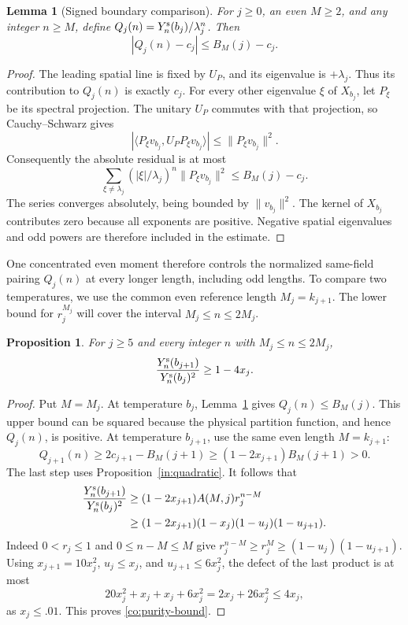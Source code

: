 \documentclass[11pt]{article}
\newtheorem{proposition}[theorem]{Proposition}
\newtheorem{lemma}[theorem]{Lemma}
\theoremstyle{remark}
\numberwithin{equation}{section}
\begin{document}
\begin{lemma}[Signed boundary comparison]\label{co:signed}
For $j\ge0$, an even $M\ge2$, and any integer $n\ge M$, define
$Q_j(n)=Y_n^{\rm s}(b_j)/\lambda_j^n$. Then
\begin{equation}\label{co:error}
 |Q_j(n)-c_j|\le B_M(j)-c_j.
\end{equation}
\end{lemma}
\begin{proof}
The leading spatial line is fixed by $U_P$, and its eigenvalue is
$+\lambda_j$. Thus its contribution to $Q_j(n)$ is exactly $c_j$.
For every other eigenvalue $\xi$ of $X_{b_j}$, let $P_\xi$ be its
spectral projection. The unitary $U_P$ commutes with that projection,
so Cauchy--Schwarz gives
\[
 |\langle P_\xi v_{b_j},U_P P_\xi v_{b_j}\rangle|
 \le\lVert P_\xi v_{b_j}\rVert^2.
\]
Consequently the absolute residual is at most
\[
 \sum_{\xi\ne\lambda_j}
       (|\xi|/\lambda_j)^n\lVert P_\xi v_{b_j}\rVert^2
 \le B_M(j)-c_j.
\]
The series converges absolutely, being bounded by $\lVert v_{b_j}\rVert^2$.
The kernel of $X_{b_j}$ contributes zero because all exponents are
positive. Negative spatial eigenvalues and odd powers are therefore
included in the estimate.
\end{proof}

One concentrated even moment therefore controls the normalized same-field
pairing $Q_j(n)$ at every longer length, including odd lengths. To compare
two temperatures, we use the common even reference length $M_j=k_{j+1}$.
The lower bound for $r_j^{M_j}$ will cover the interval $M_j\le n\le2M_j$.

\begin{proposition}\label{co:purity}
For $j\ge5$ and every integer $n$ with $M_j\le n\le2M_j$,
\begin{equation}\label{co:purity-bound}
 \frac{Y_n^{\rm s}(b_{j+1})}{Y_n^{\rm s}(b_j)^2}\ge1-4x_j.
\end{equation}
\end{proposition}
\begin{proof}
Put $M=M_j$. At temperature $b_j$, Lemma~\ref{co:signed} gives
$Q_j(n)\le B_M(j)$. This upper bound can be squared because the
physical partition function, and hence $Q_j(n)$, is positive.
At temperature $b_{j+1}$, use the same even length $M=k_{j+1}$:
\[
 Q_{j+1}(n)\ge2c_{j+1}-B_M(j+1)
 \ge(1-2x_{j+1})B_M(j+1)>0.
\]
The last step uses Proposition~\ref{in:quadratic}. It follows that
\begin{align}
 \frac{Y_n^{\rm s}(b_{j+1})}{Y_n^{\rm s}(b_j)^2}
 &\ge(1-2x_{j+1})A(M,j)r_j^{n-M} \notag\\
 &\ge(1-2x_{j+1})(1-x_j)(1-u_j)(1-u_{j+1}).
                                                    \label{co:product}
\end{align}
Indeed $0<r_j\le1$ and $0\le n-M\le M$ give
$r_j^{n-M}\ge r_j^M\ge(1-u_j)(1-u_{j+1})$.
Using $x_{j+1}=10x_j^2$, $u_j\le x_j$, and
$u_{j+1}\le6x_j^2$, the defect of the last product is at most
\[
 20x_j^2+x_j+x_j+6x_j^2
 =2x_j+26x_j^2\le4x_j,
\]
as $x_j\le.01$. This proves \eqref{co:purity-bound}.
\end{proof}
\end{document}
